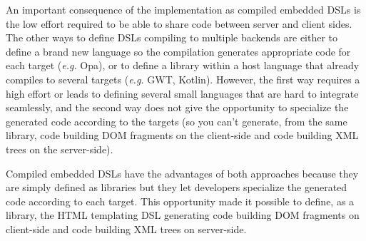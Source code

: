 \documentclass[american,english,runningheads]{llncs}
\newcommand{\eg}{\emph{e.g.}}
\begin{document}
An important consequence of the implementation as compiled embedded DSLs is the low effort required to be able to
share code between server and client sides. The other ways to define DSLs compiling to multiple backends are either
to define a brand new language so the compilation generates appropriate code for each target (\eg{} Opa), or to
define a library within a host language that already compiles to several targets (\eg{} GWT, Kotlin). However, the
first way requires a high effort or leads to defining several small languages that are hard to integrate seamlessly,
and the second way does not give the opportunity to specialize the generated code according to the targets (so you
can’t generate, from the same library, code building DOM fragments on the client-side and code building XML trees on
the server-side).

Compiled embedded DSLs have the advantages of both approaches because they are simply defined as libraries but they
let developers specialize the generated code according to each target. This opportunity made it possible to define,
as a library, the HTML templating DSL generating code building DOM fragments on client-side and code building XML
trees on server-side.
\end{document}
